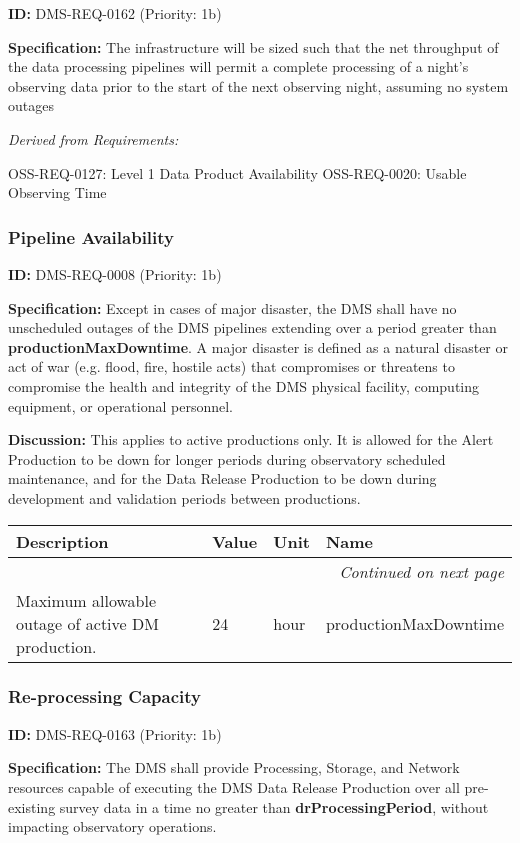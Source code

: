 \documentclass[SE,toc,lsstdraft]{lsstdoc}
\makeatletter
\newcommand{\paramname}[1]{\hspace{0pt}#1}
\newcommand{\unitname}[1]{\hspace{0pt}#1}
\newenvironment{parameters}[0]{%
\setlength\LTleft{0pt}
\setlength\LTright{\fill}
\begin{small}
\begin{longtable}[]{|p{0.49\textwidth}|l|p{0.6in}|p{1.70in}@{}|}

\hline \textbf{Description} & \textbf{Value} & \textbf{Unit} & \textbf{Name} \\ \hline
\endhead

\hline \multicolumn{4}{r}{\emph{Continued on next page}} \\
\endfoot

\hline\hline
\endlastfoot
}{%
\hline
\end{longtable}
\end{small}
}
\makeatother
\begin{document}
\label{DMS-REQ-0162}
\textbf{ID:} DMS-REQ-0162 (Priority: 1b)

\textbf{Specification:} The infrastructure will be sized such that the net throughput of the data processing pipelines will permit a complete processing of a night’s observing data prior to the start of the next observing night, assuming no system outages

\emph{Derived from Requirements:}

OSS-REQ-0127:
Level 1 Data Product Availability \newline
OSS-REQ-0020:
Usable Observing Time \newline

\subsubsection{Pipeline Availability}

\label{DMS-REQ-0008}
\textbf{ID:} DMS-REQ-0008 (Priority: 1b)

\textbf{Specification:} Except in cases of major disaster, the DMS shall have no unscheduled outages of the DMS pipelines extending over a period greater than \textbf{productionMaxDowntime}.  A major disaster is defined as a natural disaster or act of war (e.g. flood, fire, hostile acts) that compromises or threatens to compromise the health and integrity of the DMS physical facility, computing equipment, or operational personnel.

\textbf{Discussion:} This applies to active productions only. It is allowed for the Alert Production to be down for longer periods during observatory scheduled maintenance, and for the Data Release Production to be down during development and validation periods between productions.

\begin{parameters}
Maximum allowable outage of active DM production.
&
24
&
\unitname{%
hour
}
&
\paramname{%
productionMaxDowntime
} \\\hline
\end{parameters}

\subsubsection{Re-processing Capacity}

\label{DMS-REQ-0163}
\textbf{ID:} DMS-REQ-0163 (Priority: 1b)

\textbf{Specification:} The DMS shall provide Processing, Storage, and Network resources capable of executing the DMS Data Release Production over all pre-existing survey data in a time no greater than \textbf{drProcessingPeriod}, without impacting observatory operations.
\end{document}
